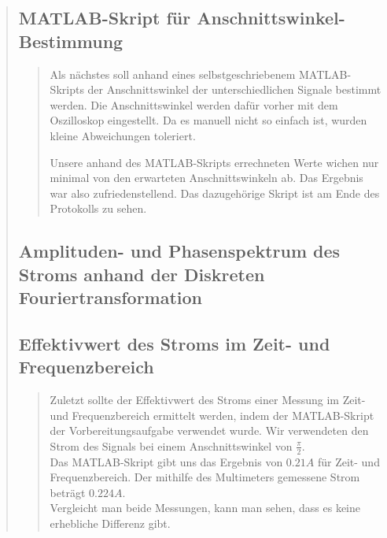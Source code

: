 \begin{quote}
\begin{quote}
	\cite{Schaltungwandlerbox}
	\end{quote}
	
	\subsection{MATLAB-Skript für Anschnittswinkel-Bestimmung}
	\begin{quote}	
	Als nächstes soll anhand eines selbstgeschriebenem MATLAB-Skripts der
	Anschnittswinkel der unterschiedlichen Signale bestimmt werden. Die
	Anschnittswinkel werden dafür vorher mit dem Oszilloskop eingestellt. Da es
	manuell nicht so einfach ist, wurden kleine Abweichungen toleriert.
	
	Unsere anhand des MATLAB-Skripts errechneten Werte wichen nur minimal von den
	erwarteten Anschnittswinkeln ab. Das Ergebnis war also zufriedenstellend. 
    Das dazugehörige Skript ist am Ende des Protokolls zu sehen.
   	\end{quote}
	
	\subsection{Amplituden- und Phasenspektrum des Stroms anhand der Diskreten
	Fouriertransformation}
	\begin{quote}
	\end{quote}
	
	\subsection{Effektivwert des Stroms im Zeit- und Frequenzbereich}
	\begin{quote}
	Zuletzt sollte der Effektivwert des Stroms einer Messung im Zeit- und
	Frequenzbereich ermittelt werden, indem der MATLAB-Skript der
	Vorbereitungsaufgabe verwendet wurde. Wir verwendeten den Strom des Signals bei
	einem Anschnittswinkel von $\frac{\pi}{2}$.\\
	Das MATLAB-Skript gibt uns das Ergebnis von $0.21 A$ für Zeit- und
	Frequenzbereich. Der mithilfe des Multimeters gemessene Strom beträgt $0.224
	A$.\\
	
	Vergleicht man beide Messungen, kann man sehen, dass es keine erhebliche
	Differenz gibt.
	
	 
	\end{quote}
\end{quote}

